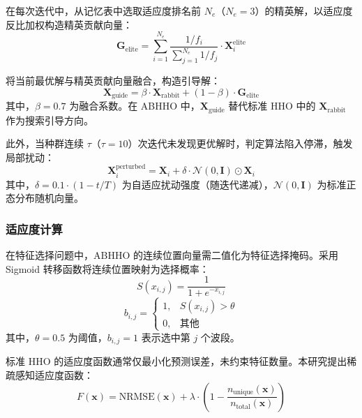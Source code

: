 \documentclass[12pt,a4paper]{article}
\begin{document}
在每次迭代中，从记忆表中选取适应度排名前 $N_e$（$N_e = 3$）的精英解，以适应度反比加权构造精英贡献向量：
\begin{equation}
    \mathbf{G}_{\mathrm{elite}} = \sum_{i=1}^{N_e} \frac{1/f_i}{\sum_{j=1}^{N_e} 1/f_j} \cdot \mathbf{X}_i^{\mathrm{elite}}
    \label{eq:elite_contribution}
\end{equation}

将当前最优解与精英贡献向量融合，构造引导解：
\begin{equation}
    \mathbf{X}_{\mathrm{guide}} = \beta \cdot \mathbf{X}_{\mathrm{rabbit}} + (1 - \beta) \cdot \mathbf{G}_{\mathrm{elite}}
    \label{eq:guide_solution}
\end{equation}
其中，$\beta = 0.7$ 为融合系数。在 ABHHO 中，$\mathbf{X}_{\mathrm{guide}}$ 替代标准 HHO 中的 $\mathbf{X}_{\mathrm{rabbit}}$ 作为搜索引导方向。

此外，当种群连续 $\tau$（$\tau = 10$）次迭代未发现更优解时，判定算法陷入停滞，触发局部扰动：
\begin{equation}
    \mathbf{X}_i^{\mathrm{perturbed}} = \mathbf{X}_i + \delta \cdot \mathcal{N}(0, \mathbf{I}) \odot \mathbf{X}_i
    \label{eq:stagnation_perturbation}
\end{equation}
其中，$\delta = 0.1 \cdot (1 - t/T)$ 为自适应扰动强度（随迭代递减），$\mathcal{N}(0, \mathbf{I})$ 为标准正态分布随机向量。

\subsubsection{适应度计算}

在特征选择问题中，ABHHO 的连续位置向量需二值化为特征选择掩码。采用 Sigmoid 转移函数将连续位置映射为选择概率：
\begin{equation}
    S(x_{i,j}) = \frac{1}{1 + e^{-x_{i,j}}}
    \label{eq:sigmoid}
\end{equation}
\begin{equation}
    b_{i,j} = \begin{cases}
        1, & S(x_{i,j}) > \theta \\
        0, & \text{其他}
    \end{cases}
    \label{eq:binarization}
\end{equation}
其中，$\theta = 0.5$ 为阈值，$b_{i,j} = 1$ 表示选中第 $j$ 个波段。

标准 HHO 的适应度函数通常仅最小化预测误差，未约束特征数量。本研究提出稀疏感知适应度函数：
\begin{equation}
    F(\mathbf{x}) = \mathrm{NRMSE}(\mathbf{x}) + \lambda \cdot \left(1 - \frac{n_{\mathrm{unique}}(\mathbf{x})}{n_{\mathrm{total}}(\mathbf{x})}\right)
    \label{eq:fitness}
\end{equation}
\end{document}
